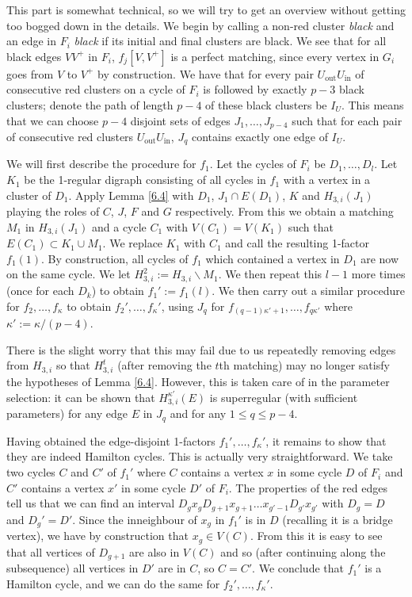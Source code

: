 \documentclass[10pt,letterpaper, reqno]{amsart}
\theoremstyle{definition}
\numberwithin{equation}{section}
\begin{document}
This part is somewhat technical, so we will try to get an overview without getting too bogged down in the details. We begin by calling a non-red cluster \textit{black} and an edge in $F_i$ \textit{black} if its initial and final clusters are black. We see that for all black edges $VV^+$ in $F_i$, $f_j[V,V^+]$ is a perfect matching, since every vertex in $G_i$ goes from $V$ to $V^+$ by construction. We have that for every pair $U_\text{out}U_\text{in}$ of consecutive red clusters on a cycle of $F_i$ is followed by exactly $p-3$ black clusters; denote the path of length $p-4$ of these black clusters be $I_U$. This means that we can choose $p-4$ disjoint sets of edges $J_1,\dots,J_{p-4}$ such that for each pair of consecutive red clusters $U_\text{out}U_\text{in}$, $J_q$ contains exactly one edge of $I_U$. 

We will first describe the procedure for $f_1$. Let the cycles of $F_i$ be $D_1,\dots,D_l$. Let $K_1$ be the 1-regular digraph consisting of all cycles in $f_1$ with a vertex in a cluster of $D_1$. Apply Lemma \ref{6.4} with $D_1$, $J_1 \cap E(D_1)$, $K$ and $H_{3,i}(J_1)$ playing the roles of $C$, $J$, $F$ and $G$ respectively. From this we obtain a matching $M_1$ in $H_{3,i}(J_1)$ and a cycle $C_1$ with $V(C_1)=V(K_1)$ such that $E(C_1) \subset K_1 \cup M_1$. We replace $K_1$ with $C_1$ and call the resulting 1-factor $f_1(1)$. By construction, all cycles of $f_1$ which contained a vertex in $D_1$ are now on the same cycle. We let $H_{3,i}^2 := H_{3,i} \backslash M_1$. We then repeat this $l-1$ more times (once for each $D_k$) to obtain $f_1':=f_1(l)$. We then carry out a similar procedure for $f_2, \dots, f_\kappa$ to obtain $f_2',\dots, f_\kappa'$, using $J_q$ for $f_{(q-1)\kappa'+1}, \dots, f_{q\kappa'}$ where $\kappa':=\kappa/(p-4)$.

There is the slight worry that this may fail due to us repeatedly removing edges from $H_{3,i}$ so that $H_{3,i}^t$ (after removing the $t$th matching) may no longer satisfy the hypotheses of Lemma \ref{6.4}. However, this is taken care of in the parameter selection: it can be shown that $H^{\kappa'}_{3,i}(E)$ is superregular (with sufficient parameters) for any edge $E$ in $J_q$ and for any $1\leq q \leq p-4$. 

Having obtained the edge-disjoint 1-factors $f_1', \dots, f_\kappa'$, it remains to show that they are indeed Hamilton cycles. This is actually very straightforward. We take two cycles $C$ and $C'$ of $f_1'$ where $C$ contains a vertex $x$ in some cycle $D$ of $F_i$ and $C'$ contains a vertex $x'$ in some cycle $D'$ of $F_i$. The properties of the red edges tell us that we can find an interval $D_gx_gD_{g+1}x_{g+1}\dots x_{g'-1}D_{g'}x_{g'}$ with $D_g=D$ and $D_g'=D'$. Since the inneighbour of $x_g$ in $f_1'$ is in $D$ (recalling it is a bridge vertex), we have by construction that $x_g \in V(C)$. From this it is easy to see that all vertices of $D_{g+1}$ are also in $V(C)$ and so (after continuing along the subsequence) all vertices in $D'$ are in $C$, so $C=C'$. We conclude that $f_1'$ is a Hamilton cycle, and we can do the same for $f_2', \dots, f_\kappa'$. 
\end{document}
